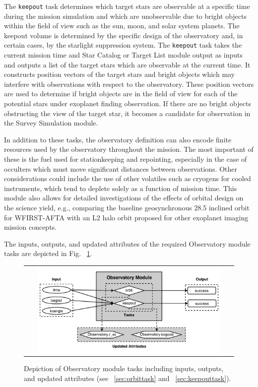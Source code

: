 \documentclass[cleanfoot]{asme2ej}
\begin{document}
The \verb+keepout+ task determines which target stars are observable at a specific time during the mission simulation and which are unobservable due to bright objects within the field of view such as the sun, moon, and solar system planets.  The keepout volume is determined by the specific design of the observatory and, in certain cases, by the starlight suppression system.  The \verb+keepout+ task takes the current mission time and Star Catalog or Target List module output as inputs and outputs a list of the target stars which are observable at the current time. It constructs position vectors of the target stars and bright objects which may interfere with observations with respect to the observatory. These position vectors are used to determine if bright objects are in the field of view for each of the potential stars under exoplanet finding observation.  If there are no bright objects obstructing the view of the target star, it becomes a candidate for observation in the Survey Simulation module.

In addition to these tasks, the observatory definition can also encode finite resources used by the observatory throughout the mission.  The most important of these is the fuel used for stationkeeping and repointing, especially in the case of occulters which must move significant distances between observations.  Other considerations could include the use of other volatiles such as cryogens for cooled instruments, which tend to deplete solely as a function of mission time.  This module also allows for detailed investigations of the effects of orbital design on the science yield, e.g., comparing the baseline geosynchronous 28.5\textdegree{} inclined orbit for WFIRST-AFTA with an L2 halo orbit proposed for other exoplanet imaging mission concepts. 

The inputs, outputs, and updated attributes of the required Observatory module tasks are depicted in Fig. ~\ref{fig:observatorymodule}.

\begin{figure}[ht]
    \begin{center}
        \begin{tabular}{c}
             \includegraphics[width=0.9\textwidth]{observatory3}
        \end{tabular}
    \end{center}
    \caption{\label{fig:observatorymodule} Depiction of Observatory module tasks including inputs, outputs, and updated attributes (see ~\ref{sec:orbittask} and ~\ref{sec:keepouttask}).}
\end{figure}
\end{document}
